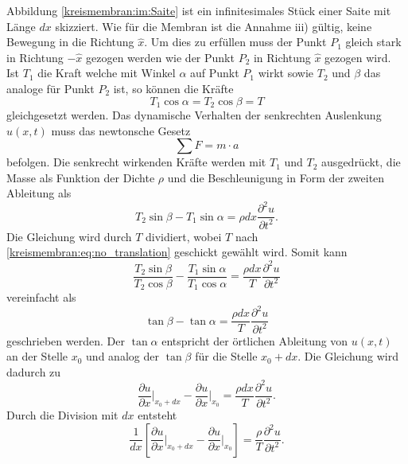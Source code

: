 Abbildung \ref{kreismembran:im:Saite} ist ein infinitesimales Stück einer Saite mit Länge $ dx $ skizziert.
Wie für die Membran ist die Annahme iii) gültig, keine Bewegung in die Richtung $ \hat{x} $.
Um dies zu erfüllen muss der Punkt $ P_1 $ gleich stark in Richtung $ -\hat{x} $ gezogen werden wie der Punkt $ P_2 $ in Richtung $ \hat{x} $ gezogen wird. Ist $ T_1 $ die Kraft welche mit Winkel $ \alpha $ auf Punkt $ P_1 $ wirkt sowie $ T_2 $ und $ \beta$ das analoge für Punkt $ P_2 $ ist, so können die Kräfte 
\begin{equation}\label{kreismembran:eq:no_translation}
	T_1 \cos \alpha = T_2 \cos \beta = T
\end{equation}
gleichgesetzt werden. 
Das dynamische Verhalten der senkrechten Auslenkung $ u(x,t) $ muss das newtonsche Gesetz 
\begin{equation*}
	\sum F = m \cdot a
\end{equation*} 
befolgen. Die senkrecht wirkenden Kräfte werden mit $ T_1 $ und $ T_2 $ ausgedrückt, die Masse als Funktion der Dichte $ \rho $ und die Beschleunigung in Form der zweiten Ableitung als
\begin{equation*}
	T_2 \sin \beta - T_1 \sin \alpha = \rho dx \frac{\partial^2 u}{\partial t^2} .
\end{equation*}
Die Gleichung wird durch $ T $ dividiert, wobei $ T $ nach \ref{kreismembran:eq:no_translation} geschickt gewählt wird. Somit kann
\begin{equation*}
	\frac{T_2 \sin \beta}{T_2 \cos \beta} - \frac{T_1 \sin \alpha}{T_1 \cos \alpha} = \frac{\rho dx}{T} \frac{\partial^2 u}{\partial t^2}
\end{equation*}
vereinfacht als  
\begin{equation*}
	\tan \beta - \tan \alpha = \frac{\rho dx}{T} \frac{\partial^2 u}{\partial t^2}
\end{equation*}
geschrieben werden. 
Der $ \tan \alpha $ entspricht der örtlichen Ableitung von $ u(x,t) $ an der Stelle $ x_0 $ und analog der $ \tan \beta $ für die Stelle $ x_0 + dx $.
Die Gleichung wird dadurch zu
\begin{equation*}
	\frac{\partial u}{\partial x} \bigg|_{x_0 + dx} - \frac{\partial u}{\partial x} \bigg|_{x_0} = \frac{\rho dx}{T} \frac{\partial^2 u}{\partial t^2}.
\end{equation*} 
Durch die Division mit $ dx $ entsteht 
\begin{equation*}
	\frac{1}{dx} \left[\frac{\partial u}{\partial x} \bigg|_{x_0 + dx} - \frac{\partial u}{\partial x} \bigg|_{x_0}\right] = \frac{\rho}{T}\frac{\partial^2 u}{\partial t^2}.
\end{equation*}
